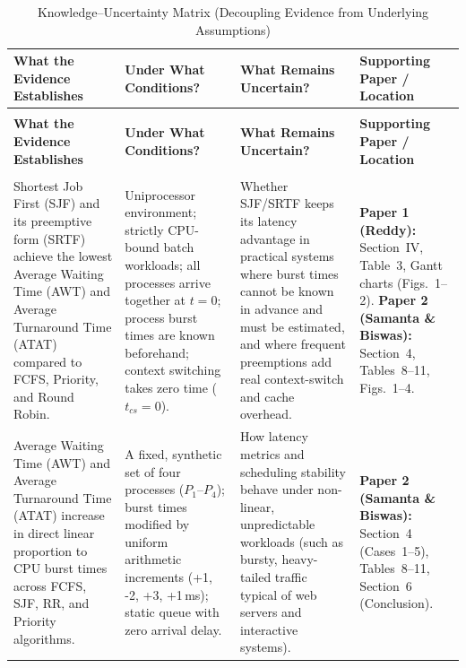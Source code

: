 \documentclass[11pt]{article}
\begin{document}
\vspace{0.5em}
{\small
\begin{longtable}{|>{\raggedright\arraybackslash}p{4.0cm}|>{\raggedright\arraybackslash}p{3.5cm}|>{\raggedright\arraybackslash}p{4.3cm}|>{\raggedright\arraybackslash}p{2.8cm}|}
    \caption{Knowledge--Uncertainty Matrix (Decoupling Evidence from Underlying Assumptions)}
    \label{tab:knowledge_uncertainty} \\
    
    \hline
    \textbf{What the Evidence Establishes} & \textbf{Under What Conditions?} & \textbf{What Remains Uncertain?} & \textbf{Supporting Paper / Location} \\
    \hline
    \endfirsthead 
    
    \multicolumn{4}{c}{\tablename\ \thetable\ -- \textit{Continued from previous page}} \\
    \hline
    \textbf{What the Evidence Establishes} & \textbf{Under What Conditions?} & \textbf{What Remains Uncertain?} & \textbf{Supporting Paper / Location} \\
    \hline
    \endhead

    \hline
    \multicolumn{4}{r}{\textit{Continued on next page}} \\
    \endfoot

    \hline
    \endlastfoot

    Shortest Job First (SJF) and its preemptive form (SRTF) achieve the lowest Average Waiting Time (AWT) and Average Turnaround Time (ATAT) compared to FCFS, Priority, and Round Robin. & 
    Uniprocessor environment; strictly CPU-bound batch workloads; all processes arrive together at $t=0$; process burst times are known beforehand; context switching takes zero time ($t_{cs} = 0$). & 
    Whether SJF/SRTF keeps its latency advantage in practical systems where burst times cannot be known in advance and must be estimated, and where frequent preemptions add real context-switch and cache overhead. & 
    \textbf{Paper 1 (Reddy):} Section~IV, Table~3, Gantt charts (Figs.~1--2).\newline\newline
    \textbf{Paper 2 (Samanta \& Biswas):} Section~4, Tables~8--11, Figs.~1--4. \\
    \hline

    Average Waiting Time (AWT) and Average Turnaround Time (ATAT) increase in direct linear proportion to CPU burst times across FCFS, SJF, RR, and Priority algorithms. & 
    A fixed, synthetic set of four processes ($P_1$--$P_4$); burst times modified by uniform arithmetic increments (+1, -2, +3, +1\,ms); static queue with zero arrival delay. & 
    How latency metrics and scheduling stability behave under non-linear, unpredictable workloads (such as bursty, heavy-tailed traffic typical of web servers and interactive systems). & 
    \textbf{Paper 2 (Samanta \& Biswas):} Section~4 (Cases~1--5), Tables~8--11, Section~6 (Conclusion). \\
    \hline


\end{longtable}}
\end{document}
